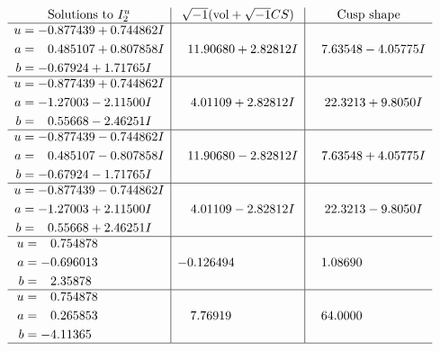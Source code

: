\documentclass[1p]{elsarticle_modified}
\theoremstyle{definition}
\newcommand{\I}{\sqrt{-1}}
\begin{document}
$$\begin{array}{c|c|c}  
\text{Solutions to }I^u_{2}& \I (\text{vol} + \sqrt{-1}CS) & \text{Cusp shape}\\
 \hline 
\begin{aligned}
u &= -0.877439 + 0.744862 I \\
a &= \phantom{-}0.485107 + 0.807858 I \\
b &= -0.67924 + 1.71765 I\end{aligned}
 & \phantom{-}11.90680 + 2.82812 I & \phantom{-}7.63548 - 4.05775 I \\ \hline\begin{aligned}
u &= -0.877439 + 0.744862 I \\
a &= -1.27003 - 2.11500 I \\
b &= \phantom{-}0.55668 - 2.46251 I\end{aligned}
 & \phantom{-}4.01109 + 2.82812 I & \phantom{-}22.3213 + 9.8050 I \\ \hline\begin{aligned}
u &= -0.877439 - 0.744862 I \\
a &= \phantom{-}0.485107 - 0.807858 I \\
b &= -0.67924 - 1.71765 I\end{aligned}
 & \phantom{-}11.90680 - 2.82812 I & \phantom{-}7.63548 + 4.05775 I \\ \hline\begin{aligned}
u &= -0.877439 - 0.744862 I \\
a &= -1.27003 + 2.11500 I \\
b &= \phantom{-}0.55668 + 2.46251 I\end{aligned}
 & \phantom{-}4.01109 - 2.82812 I & \phantom{-}22.3213 - 9.8050 I \\ \hline\begin{aligned}
u &= \phantom{-}0.754878\phantom{ +0.000000I} \\
a &= -0.696013\phantom{ +0.000000I} \\
b &= \phantom{-}2.35878\phantom{ +0.000000I}\end{aligned}
 & -0.126494\phantom{ +0.000000I} & \phantom{-}1.08690\phantom{ +0.000000I} \\ \hline\begin{aligned}
u &= \phantom{-}0.754878\phantom{ +0.000000I} \\
a &= \phantom{-}0.265853\phantom{ +0.000000I} \\
b &= -4.11365\phantom{ +0.000000I}\end{aligned}
 & \phantom{-}7.76919\phantom{ +0.000000I} & \phantom{-}64.0000\phantom{ +0.000000I}\\
 \hline 
 \end{array}$$\newpage\newpage\renewcommand{\arraystretch}{1}
\end{document}
